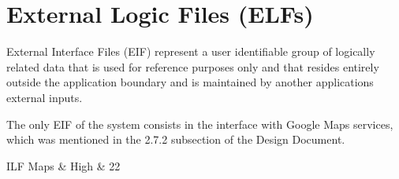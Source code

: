\section{External Logic Files (ELFs)}

External Interface Files (EIF) represent a user identifiable group of logically related data that is used for reference purposes only and that resides entirely outside the application boundary and is maintained by another applications external inputs.

The only EIF of the system consists in the interface with Google Maps services, which was mentioned in the 2.7.2 subsection of the Design Document.

\begin{fpcounttable}{ILF}
Maps & High & 22 \\
\end{fpcounttable}
